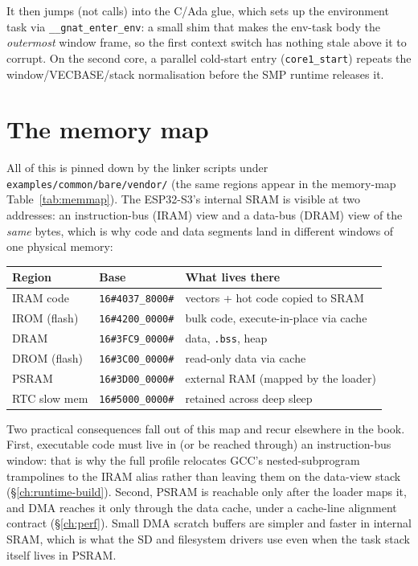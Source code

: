 It then jumps (not calls) into the C/Ada glue, which sets up the environment task
via \texttt{\_\_gnat\_enter\_env}: a small shim that makes the env-task body the
\emph{outermost} window frame, so the first context switch has nothing stale
above it to corrupt. On the second core, a parallel cold-start entry
(\texttt{core1\_start}) repeats the window/VECBASE/stack normalisation before the
SMP runtime releases it.

\section{The memory map}

All of this is pinned down by the linker scripts under
\texttt{examples/common/bare/vendor/} (the same regions appear in the memory-map
Table~\ref{tab:memmap}). The ESP32-S3's internal SRAM is visible at two
addresses: an instruction-bus (IRAM) view and a data-bus (DRAM) view of the
\emph{same} bytes, which is why code and data segments land in different
windows of one physical memory:

\begin{center}
\begin{tabular}{l l l}
\toprule
\textbf{Region} & \textbf{Base} & \textbf{What lives there} \\ \midrule
IRAM code     & \texttt{16\#4037\_8000\#} & vectors + hot code copied to SRAM \\
IROM (flash)  & \texttt{16\#4200\_0000\#} & bulk code, execute-in-place via cache \\
DRAM          & \texttt{16\#3FC9\_0000\#} & data, \texttt{.bss}, heap \\
DROM (flash)  & \texttt{16\#3C00\_0000\#} & read-only data via cache \\
PSRAM         & \texttt{16\#3D00\_0000\#} & external RAM (mapped by the loader) \\
RTC slow mem  & \texttt{16\#5000\_0000\#} & retained across deep sleep \\
\bottomrule
\end{tabular}
\end{center}

Two practical consequences fall out of this map and recur elsewhere in the book.
First, executable code must live in (or be reached through) an instruction-bus
window: that is why the full profile relocates GCC's nested-subprogram
trampolines to the IRAM alias rather than leaving them on the data-view stack
(\S\ref{ch:runtime-build}). Second, PSRAM is reachable only after the loader maps
it, and DMA reaches it only through the data cache, under a cache-line alignment
contract (\S\ref{ch:perf}). Small DMA scratch buffers are simpler and faster in
internal SRAM, which is what the SD and filesystem drivers use even when the
task stack itself lives in PSRAM.

